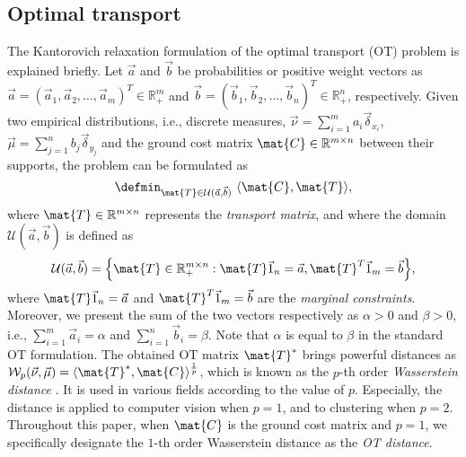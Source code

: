 \subsection{Optimal transport}
The Kantorovich relaxation formulation of the optimal transport (OT) problem  is explained briefly. Let $\vec{a}$ and $\vec{b}$ be {probabilities} or positive weight vectors as $\vec{a}=(\vec{a}_1, \vec{a}_2, \ldots, \vec{a}_m)^T \in \mathbb{R}_+^m$ and $\vec{b}=(\vec{b}_1, \vec{b}_2, \ldots, \vec{b}_n)^T \in \mathbb{R}_+^n$, respectively. Given two empirical distributions, i.e., {discrete measures}, $\vec{\nu}=\!\sum_{i=1}^m a_i\vec{\delta}_{{x}_i}$, $\vec{\mu}=\!\sum_{j=1}^n b_j\vec{\delta}_{{y}_j}$ and the ground cost matrix $\mat{C} \in \mathbb{R}^{m \times n}$ between their supports, the problem can be formulated as
\begin{equation}
	\label{eq:FormulationOptimalTransport}
	 \defmin_{\scriptsize {\mat{T} \in \mathcal{U}(\vec{a},\vec{b})}}\ \langle \mat{C} ,\mat{T}\rangle,
\end{equation}
where $\mat{T} \in \mathbb{R}^{m \times n}$ represents the {\it transport matrix}, and where the domain $\mathcal{U}(\vec{a},\vec{b})$ is defined as 
\begin{equation}
	\label{eq:TransportPolytope}
	\mathcal{U}(\vec{a},\vec{b}) = \Bigl\{ \mat{T} \in \mathbb{R}^{m \times n}_{+}: \mat{T}\vec{1}_n = \vec{a},\mat{T}^{T}\vec{1}_m = \vec{b} \Bigr\},
\end{equation}
where $\mat{T}\vec{1}_n = \vec{a}$ and $\mat{T}^{T}\vec{1}_m = \vec{b}$ are the {\it marginal constraints}. Moreover, we present the sum of the two vectors respectively as $\alpha > 0$ and $\beta > 0$, i.e., $\sum_{i=1}^m {\vec{a}_i} = \alpha$ and $\sum_{i=1}^n {\vec{b}_i} = \beta$. Note that $\alpha$ is equal to $\beta$ in the standard OT formulation. The obtained OT matrix $\mat{T}^*$ brings powerful distances as $\mathcal{W}_p(\vec{\nu},\vec{\mu}) = \langle \mat{T}^*,\mat{C} \rangle^{\frac{1}{p}}$, which is known as the $p$-th order {\it Wasserstein distance} \cite{Villani_2008_OTBook}. It is used in various fields according to the value of $p$. Especially, the distance is applied to computer vision \cite{Levina_ICCV_2001} when $p=1$, and to clustering \cite{cuturi14barycenter} when $p=2$. Throughout this paper, when $\mat{C}$ is the {ground cost} matrix and $p=1$, we specifically designate the $1$-th order Wasserstein distance as the {\it OT distance}.